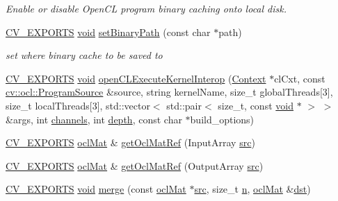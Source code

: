 \begin{DoxyCompactItemize}
\begin{DoxyCompactList}\small\item\em Enable or disable Open\-C\-L program binary caching onto local disk. \end{DoxyCompactList}\item 
\hyperlink{core_2types__c_8h_a1bf9f0e121b54272da02379cfccd0a2b}{C\-V\-\_\-\-E\-X\-P\-O\-R\-T\-S} \hyperlink{legacy_8hpp_a8bb47f092d473522721002c86c13b94e}{void} \hyperlink{namespacecv_1_1ocl_a6d1c465ce7981e02fe8a1aa523343110}{set\-Binary\-Path} (const char $\ast$path)
\begin{DoxyCompactList}\small\item\em set where binary cache to be saved to \end{DoxyCompactList}\item 
\hyperlink{core_2types__c_8h_a1bf9f0e121b54272da02379cfccd0a2b}{C\-V\-\_\-\-E\-X\-P\-O\-R\-T\-S} \hyperlink{legacy_8hpp_a8bb47f092d473522721002c86c13b94e}{void} \hyperlink{namespacecv_1_1ocl_ae62988b5cb1675bae759627cf3999ce2}{open\-C\-L\-Execute\-Kernel\-Interop} (\hyperlink{classcv_1_1ocl_1_1Context}{Context} $\ast$cl\-Cxt, const \hyperlink{structcv_1_1ocl_1_1ProgramSource}{cv\-::ocl\-::\-Program\-Source} \&source, string kernel\-Name, size\-\_\-t global\-Threads\mbox{[}3\mbox{]}, size\-\_\-t local\-Threads\mbox{[}3\mbox{]}, std\-::vector$<$ std\-::pair$<$ size\-\_\-t, const \hyperlink{legacy_8hpp_a8bb47f092d473522721002c86c13b94e}{void} $\ast$ $>$ $>$ \&args, int \hyperlink{core__c_8h_a2876852c6a9947679c3003692de5aa83}{channels}, int \hyperlink{core__c_8h_acb5ba97551079e0b072c62c21d784ac5}{depth}, const char $\ast$build\-\_\-options)
\item 
\hyperlink{core_2types__c_8h_a1bf9f0e121b54272da02379cfccd0a2b}{C\-V\-\_\-\-E\-X\-P\-O\-R\-T\-S} \hyperlink{classcv_1_1ocl_1_1oclMat}{ocl\-Mat} \& \hyperlink{namespacecv_1_1ocl_ac1d97606634e326448ad31f9f490ce2b}{get\-Ocl\-Mat\-Ref} (Input\-Array \hyperlink{legacy_8hpp_a371cd109b74033bc4366f584edd3dacc}{src})
\item 
\hyperlink{core_2types__c_8h_a1bf9f0e121b54272da02379cfccd0a2b}{C\-V\-\_\-\-E\-X\-P\-O\-R\-T\-S} \hyperlink{classcv_1_1ocl_1_1oclMat}{ocl\-Mat} \& \hyperlink{namespacecv_1_1ocl_a14784d8a5c9ea0a7a5aa2fcdf56eb349}{get\-Ocl\-Mat\-Ref} (Output\-Array \hyperlink{legacy_8hpp_a371cd109b74033bc4366f584edd3dacc}{src})
\item 
\hyperlink{core_2types__c_8h_a1bf9f0e121b54272da02379cfccd0a2b}{C\-V\-\_\-\-E\-X\-P\-O\-R\-T\-S} \hyperlink{legacy_8hpp_a8bb47f092d473522721002c86c13b94e}{void} \hyperlink{namespacecv_1_1ocl_a1348da00bbcb04fae549674506dbdde1}{merge} (const \hyperlink{classcv_1_1ocl_1_1oclMat}{ocl\-Mat} $\ast$\hyperlink{legacy_8hpp_a371cd109b74033bc4366f584edd3dacc}{src}, size\-\_\-t \hyperlink{legacy_8hpp_a76f11d9a0a47b94f72c2d0e77fb32240}{n}, \hyperlink{classcv_1_1ocl_1_1oclMat}{ocl\-Mat} \&\hyperlink{photo__c_8h_aed13e2a25279b24dc954073233fef7a5}{dst})

\end{DoxyCompactItemize}
